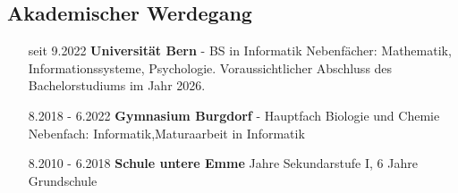 \documentclass{article}
\begin{document}
\subsection{Akademischer Werdegang}
\begin{itemize}[leftmargin=3cm, labelsep = 0.5cm ]
    \item[seit 9.2022] \textbf{Universit\"at Bern} - BS in Informatik \newline
    Nebenf\"acher: Mathematik, Informationssysteme, Psychologie. Voraussichtlicher Abschluss des Bachelorstudiums im Jahr 2026.  \\
    \item[8.2018 - 6.2022] \textbf{Gymnasium  Burgdorf} - Hauptfach Biologie und Chemie  \newline
    Nebenfach: Informatik,\newline Maturaarbeit in Informatik\\
    \item[8.2010 - 6.2018] \textbf{Schule untere Emme}  Jahre Sekundarstufe I, 6 Jahre Grundschule 
\end{itemize}
\end{document}
